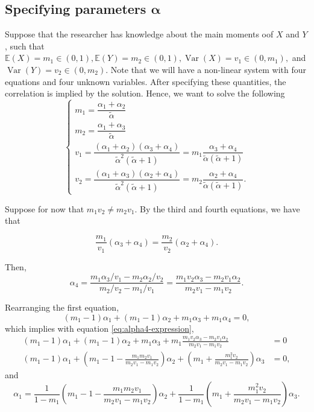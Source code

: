 \documentclass[a4paper, notitlepage, 11pt]{article}
\newcommand{\ev}{\mathbb{E}}
\newcommand{\var}{\operatorname{Var}}
\theoremstyle{definition}
\theoremstyle{remark}
\begin{document}
\subsection{Specifying parameters
\texorpdfstring{$\boldsymbol{\alpha}$}{alpha}}

Suppose that the researcher has knowledge about the main moments oof $X$ and
$Y$, such that $\ev(X) = m_1 \in (0,1), \ev(Y) = m_2 \in (0,1), \var(X) = v_1
\in (0,m_1),$ and $\var(Y) =
v_2 \in (0,m_2)$. Note that we will have a non-linear system with four equations and four
unknown variables. After specifying these quantities, the correlation is
implied by the solution. Hence, we want to solve the following 
\begin{equation}
  \begin{cases}
    m_1 = \dfrac{\alpha_1+\alpha_2}{\tilde{\alpha}} \\
    m_2 = \dfrac{\alpha_1+\alpha_3}{\tilde{\alpha}} \\ 
    v_1 = \dfrac{(\alpha_1+\alpha_2)(\alpha_3+\alpha_4)}{\tilde{\alpha}^2(\tilde{\alpha}+1)} = m_1\dfrac{\alpha_3+\alpha_4}{\tilde{\alpha}(\tilde{\alpha}+1)} \\
    v_2 = \dfrac{(\alpha_1+\alpha_3)(\alpha_2+\alpha_4)}{\tilde{\alpha}^2(\tilde{\alpha}+1)} = m_2\dfrac{\alpha_2+\alpha_4}{\tilde{\alpha}(\tilde{\alpha}+1)}.
  \end{cases}
\end{equation}

Suppose for now that $m_1v_2 \neq m_2v_1$. By the third and fourth equations, we have that 

$$
\frac{m_1}{v_1}(\alpha_3+\alpha_4) = \frac{m_2}{v_2}(\alpha_2+\alpha_4). 
$$

Then, 
\begin{equation}
  \label{eq:alpha4-expression}
  \alpha_4 = \frac{m_1\alpha_3/v_1 - m_2\alpha_2/v_2}{m_2/v_2 - m_1/v_1} = \frac{m_1v_2\alpha_3 - m_2v_1\alpha_2}{m_2v_1 - m_1v_2}.
\end{equation}

Rearranging the first equation, 
$$
(m_1 - 1)\alpha_1 + (m_1 - 1)\alpha_2 + m_1\alpha_3 + m_1\alpha_4 = 0, 
$$
which implies with equation \eqref{eq:alpha4-expression},
\begin{align}
  (m_1 - 1)\alpha_1 + (m_1 - 1)\alpha_2 + m_1\alpha_3 + m_1\frac{m_1v_2\alpha_3 - m_2v_1\alpha_2}{m_2v_1 - m_1v_2} &= 0 \\
  (m_1 - 1)\alpha_1 + \left(m_1 - 1 - \frac{m_1m_2v_1}{m_2v_1 - m_1v_2}\right)\alpha_2 + \left(m_1 + \frac{m_1^2v_2}{m_2v_1 - m_1v_2}\right)\alpha_3 &= 0,  
\end{align}
and 
\begin{equation}
  \label{eq:alpha1-expression}
  \alpha_1 = \frac{1}{1-m_1}\left(m_1 - 1 - \frac{m_1m_2v_1}{m_2v_1 - m_1v_2}\right)\alpha_2 + \frac{1}{1-m_1}\left(m_1 + \frac{m_1^2v_2}{m_2v_1 - m_1v_2}\right)\alpha_3.
\end{equation}
\end{document}
